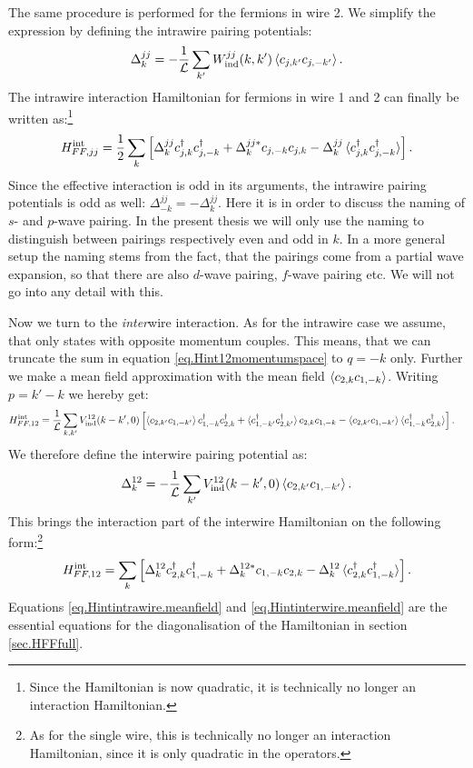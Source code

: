 The same procedure is performed for the fermions in wire 2. We simplify the expression by defining the intrawire pairing potentials:
\begin{equation}
\Delta^{jj}_k = -\frac{1}{\mathcal{L}}\sum_{k'}W^{jj}_{\text{ind}}(k,k')\braket {c_{j, k'}c_{j, -k'}}.
\label{eq.intrawirepairingpotentialdef}
\end{equation}
The intrawire interaction Hamiltonian for fermions in wire 1 and 2 can finally be written as:\footnote{Since the Hamiltonian is now quadratic, it is technically no longer an interaction Hamiltonian.}
\begin{equation}
H^\text{int}_{FF,jj} = \frac{1}{2}\sum_k \left[\Delta^{jj}_k c^\dagger_{j,k}c^\dagger_{j,-k} + \Delta^{jj *}_k c_{j,-k}c_{j,k} - \Delta^{jj}_k\braket{c^\dagger_{j,k}c^\dagger_{j,-k}} \right].
\label{eq.Hintintrawire.meanfield}
\end{equation}
Since the effective interaction is odd in its arguments, the intrawire pairing potentials is odd as well: $\Delta^{jj}_{-k} = -\Delta^{jj}_k$. Here it is in order to discuss the naming of $s$- and $p$-wave pairing. In the present thesis we will only use the naming to distinguish between pairings respectively even and odd in $k$. In a more general setup the naming stems from the fact, that the pairings come from a partial wave expansion, so that there are also $d$-wave pairing, $f$-wave pairing etc. We will not go into any detail with this.

Now we turn to the \textit{inter}wire interaction. As for the intrawire case we assume, that only states with opposite momentum couples. This means, that we can truncate the sum in equation \eqref{eq.Hint12momentumspace} to $q = -k$ only. Further we make a mean field approximation with the mean field $\braket{c_{2,k}c_{1,-k}}$. Writing $p = k' - k$ we hereby get:
\begin{align}
H^\text{int}_{FF,12} = \frac{1}{\mathcal{L}} \sum_{k,k'} V_{\text{ind}}^{12}(k - k',0) & \left[\braket{c_{2,k'}c_{1,-k'}}c^\dagger_{1,-k}c^\dagger_{2,k} + \braket{c^\dagger_{1,-k'}c^\dagger_{2,k'}}c_{2,k}c_{1,-k} - \braket{c_{2,k'}c_{1,-k'}}\braket{c^\dagger_{1,-k}c^\dagger_{2,k}} \right]. \nonumber
\end{align}
We therefore define the interwire pairing potential as:
\begin{equation}
\Delta^{12}_k = -\frac{1}{\mathcal{L}} \sum_{k'} V_{\text{ind}}^{12}(k - k',0)\braket{c_{2,k'}c_{1,-k'}}.
\label{eq.interwirepairingpotentialdef}
\end{equation}
This brings the interaction part of the interwire Hamiltonian on the following form:\footnote{As for the single wire, this is technically no longer an interaction Hamiltonian, since it is only quadratic in the operators.}
\begin{equation}
H^\text{int}_{FF,12} = \sum_{k} \left[\Delta^{12}_k c^\dagger_{2,k}c^\dagger_{1,-k} + \Delta^{12 *}_k c_{1,-k}c_{2,k} - \Delta^{12}_k\braket{c^\dagger_{2,k}c^\dagger_{1,-k}} \right].
\label{eq.Hintinterwire.meanfield}
\end{equation}
Equations \ref{eq.Hintintrawire.meanfield} and \ref{eq.Hintinterwire.meanfield} are the essential equations for the diagonalisation of the Hamiltonian in section \ref{sec.HFFfull}. 

